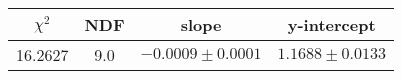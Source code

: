 \begin{tabular}{|c|c|c|c|}

\hline
$\chi^{2}$ & NDF & slope & y-intercept  \\
\hline
16.2627 & 9.0 & $-0.0009\pm0.0001$ & $1.1688\pm0.0133$ \\
\hline

\end{tabular}